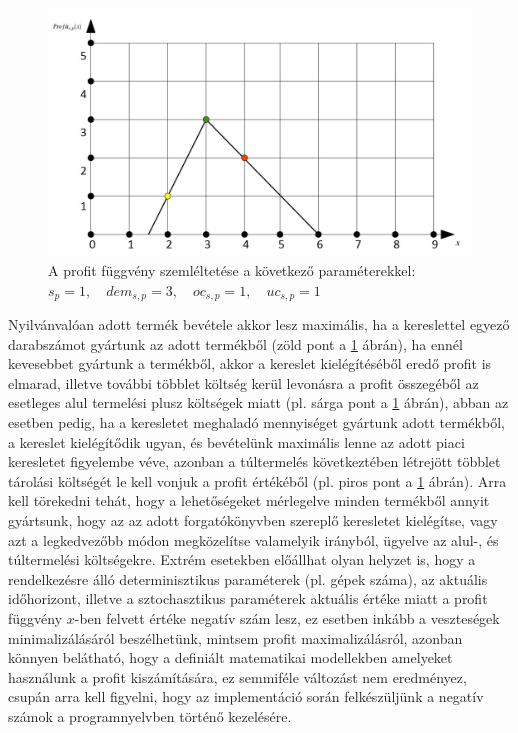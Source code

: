 \begin{figure}
\begin{center}
\includegraphics[scale=0.47]{profit_func}
\caption[A profit függvény szemléltetése a következő paraméterekkel:; $s_p=1,\quad dem_{s,p}=3, \quad oc_{s,p}=1, \quad  uc_{s,p}=1$]
    {A profit függvény szemléltetése a következő paraméterekkel: \\ $s_p=1,\quad dem_{s,p}=3, \quad oc_{s,p}=1, \quad  uc_{s,p}=1$\endtabular}
\label{profit_func}
\end{center}
\end{figure}
Nyilvánvalóan adott termék bevétele akkor lesz maximális, ha a kereslettel egyező darabszámot gyártunk az adott termékből (zöld pont a \ref{profit_func} ábrán), ha ennél kevesebbet gyártunk a termékből, akkor a kereslet kielégítéséből eredő profit is elmarad, illetve további többlet költség kerül levonásra a profit összegéből az esetleges alul termelési plusz költségek miatt (pl. sárga pont a \ref{profit_func} ábrán), abban az esetben pedig, ha a keresletet meghaladó mennyiséget gyártunk adott termékből, a kereslet kielégítődik ugyan, és bevételünk maximális lenne az adott piaci keresletet figyelembe véve, azonban a túltermelés következtében létrejött többlet tárolási költségét le kell vonjuk a profit értékéből (pl. piros pont a \ref{profit_func} ábrán). Arra kell törekedni tehát, hogy a lehetőségeket mérlegelve minden termékből annyit gyártsunk, hogy az az adott forgatókönyvben szereplő keresletet kielégítse, vagy azt a legkedvezőbb módon megközelítse valamelyik irányból, ügyelve az alul-, és túltermelési költségekre. Extrém esetekben előállhat olyan helyzet is, hogy a rendelkezésre álló determinisztikus paraméterek (pl. gépek száma), az aktuális időhorizont, illetve a sztochasztikus paraméterek aktuális értéke miatt a profit függvény $x$-ben felvett értéke negatív szám lesz, ez esetben inkább a veszteségek minimalizálásáról beszélhetünk, mintsem profit maximalizálásról, azonban könnyen belátható, hogy a definiált matematikai modellekben amelyeket használunk a profit kiszámítására, ez semmiféle változást nem eredményez, csupán arra kell figyelni, hogy az implementáció során felkészüljünk a negatív számok a programnyelvben történő kezelésére.